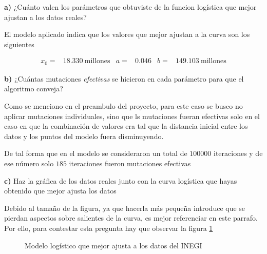 \documentclass{article}
\begin{document}
\textbf{a)} ¿Cuánto valen los parámetros que obtuviste de la funcion logística que mejor ajustan a los datos reales?

\vspace{10pt}

El modelo aplicado indica que los valores que mejor ajustan a la curva son los siguientes

\begin{align*}
    x_0 =& 18.330 \ \text{millones} & a =& 0.046 & b =& 149.103 \ \text{millones}
\end{align*}

\vspace{10pt}

\textbf{b)} ¿Cuántas mutaciones \textit{efectivas} se hicieron en cada parámetro para que el algoritmo conveja?

\vspace{10pt}

Como se menciono en el preambulo del proyecto, para este caso se busco no aplicar mutaciones individuales, sino que ls mutaciones fueran efectivas solo en el caso en que la combinación de valores era tal que la distancia inicial entre los datos y los puntos del modelo fuera disminuyendo. 

\vspace{10pt}

De tal forma que en el modelo se consideraron un total de $100000$ iteraciones y de ese número solo $185$ iteraciones fueron mutaciones efectivas 


\vspace{10pt}



\textbf{c)} Haz la gráfica de los datos reales junto con la curva logística que hayas obtenido que mejor ajusta los datos

\vspace{10pt}


Debido al tamaño de la figura, ya que hacerla más pequeña introduce que se pierdan aspectos sobre salientes de la curva, es mejor referenciar en este parrafo. Por ello, para contestar esta pregunta hay que observar la figura \ref{f1}

\begin{figure}[h!]
    \centering
    \scalebox{0.7}{}
    \caption{Modelo logístico que mejor ajusta a los datos del INEGI}
    \label{f1}
\end{figure}


\vspace{10pt}
\end{document}
